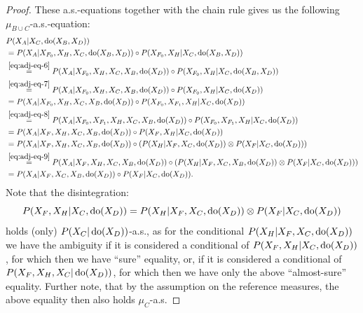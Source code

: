 \begin{Thm}
\begin{proof}
These a.s.-equations together with the chain rule gives us the following
$\mu_{B \cup C}$-a.s.-equation:
\begin{align*}
 & P(X_A|X_C,\operatorname{do}(X_B,X_D)) \\
 &= P(X_A|X_{F_0},X_H,X_C,\operatorname{do}(X_B,X_D)) \circ P(X_{F_0},X_H|X_C,\operatorname{do}(X_B,X_D))\\
 &\stackrel{\ref{eq:adj-eq-6}}{=}
 P(X_A|X_{F_0},X_H,X_C,X_B,\operatorname{do}(X_D))\circ P(X_{F_0},X_H|X_C,\operatorname{do}(X_B,X_D)) \\
 &\stackrel{\ref{eq:adj-eq-7}}{=}
 P(X_A|X_{F_0},X_H,X_C,X_B,\operatorname{do}(X_D))\circ P(X_{F_0},X_H|X_C,\operatorname{do}(X_D)) \\
 &\stackrel{}{=}
 P(X_A|X_{F_0},X_H,X_C,X_B,\operatorname{do}(X_D))\circ P(X_{F_0},X_{F_1},X_H|X_C,\operatorname{do}(X_D)) \\
 & \stackrel{\ref{eq:adj-eq-8}}{=}
 P(X_A|X_{F_0},X_{F_1},X_H,X_C,X_B,\operatorname{do}(X_D))\circ P(X_{F_0},X_{F_1},X_H|X_C,\operatorname{do}(X_D)) \\
  & =
 P(X_A|X_F,X_H,X_C,X_B,\operatorname{do}(X_D))\circ P(X_F,X_H|X_C,\operatorname{do}(X_D)) \\
 & \stackrel{}{=}
  P(X_A|X_F,X_H,X_C,X_B,\operatorname{do}(X_D))\circ \left ( P(X_H|X_F,X_C,\operatorname{do}(X_D)) \otimes P(X_F|X_C,\operatorname{do}(X_D)) \right ) \\
  & \stackrel{\ref{eq:adj-eq-9}}{=}
 P(X_A|X_F,X_H,X_C,X_B,\operatorname{do}(X_D))\circ \left ( P(X_H|X_F,X_C,X_B,\operatorname{do}(X_D)) \otimes P(X_F|X_C,\operatorname{do}(X_D))  \right ) \\
   & \stackrel{}{=}
 P(X_A|X_F,X_C,X_B,\operatorname{do}(X_D))\circ  P(X_F|X_C,\operatorname{do}(X_D)).
    \end{align*}
Note that the disintegration: 
    \[ P(X_F,X_H|X_C,\operatorname{do}(X_D)) = P(X_H|X_F,X_C,\operatorname{do}(X_D)) \otimes P(X_F|X_C,\operatorname{do}(X_D)) \]
    holds (only) $P(X_C|\operatorname{do}(X_D))$-a.s., as for the conditional $P(X_H|X_F,X_C,\operatorname{do}(X_D))$ we have the ambiguity if it is considered a conditional of $P(X_F,X_H|X_C,\operatorname{do}(X_D))$, for which then we have ``sure'' equality, or, if it is considered a conditional of $P(X_F,X_H,X_C|\operatorname{do}(X_D))$, for which then we have only the above ``almost-sure'' equality.
Further note, that by the assumption on the reference measures, the above equality then also holds $\mu_{C}$-a.s.
\end{proof}
\end{Thm}


